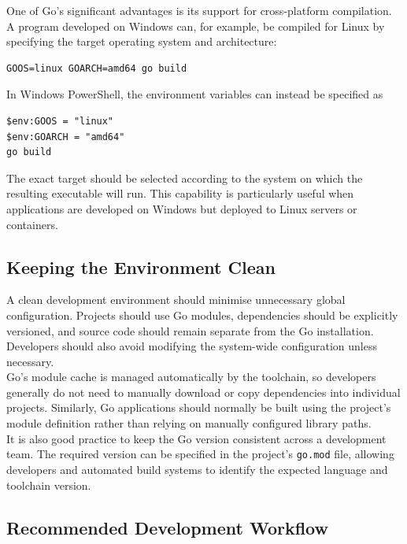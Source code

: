 One of Go's significant advantages is its support for cross-platform compilation. A program developed on Windows can, for example, be compiled for Linux by specifying the target operating system and architecture:

\begin{lstlisting}
GOOS=linux GOARCH=amd64 go build
\end{lstlisting}

In Windows PowerShell, the environment variables can instead be specified as

\begin{lstlisting}
$env:GOOS = "linux"
$env:GOARCH = "amd64"
go build
\end{lstlisting}

The exact target should be selected according to the system on which the resulting executable will run. This capability is particularly useful when applications are developed on Windows but deployed to Linux servers or containers.

\subsection{Keeping the Environment Clean}

A clean development environment should minimise unnecessary global configuration. Projects should use Go modules, dependencies should be explicitly versioned, and source code should remain separate from the Go installation. Developers should also avoid modifying the system-wide configuration unless necessary.\\

Go's module cache is managed automatically by the toolchain, so developers generally do not need to manually download or copy dependencies into individual projects. Similarly, Go applications should normally be built using the project's module definition rather than relying on manually configured library paths.\\

It is also good practice to keep the Go version consistent across a development team. The required version can be specified in the project's \texttt{go.mod} file, allowing developers and automated build systems to identify the expected language and toolchain version.\\

\subsection{Recommended Development Workflow}

